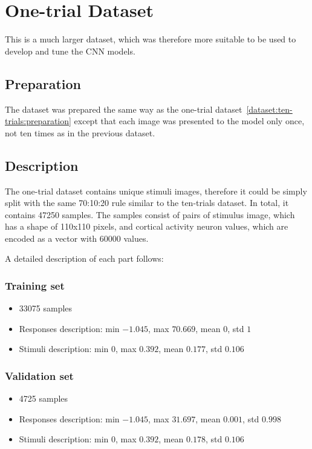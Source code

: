 \section{One-trial Dataset}
\label{dataset:one-trial}
This is a much larger dataset, which was therefore more suitable to be used to develop and tune the CNN models.


\subsection{Preparation}
\label{dataset:one-trial:preparation}
The dataset was prepared the same way as the one-trial dataset~\ref{dataset:ten-trials:preparation} except that each image was presented to the model only once, not ten times as in the previous dataset.


\subsection{Description}
\label{dataset:one-trial:description}

The one-trial dataset contains unique stimuli images, therefore it could be simply split with the same 70:10:20 rule similar to the ten-trials dataset. In total, it contains 47250 samples.
The samples consist of pairs of stimulus image, which has a shape of 110x110 pixels, and cortical activity neuron values, which are encoded as a vector with 60000 values.

A detailed description of each part follows:

\subsubsection{Training set}
\begin{itemize}
\item 33075 samples
\item Responses description: min $-1.045$, max $70.669$, mean $0$, std $1$
\item Stimuli description: min $0$, max $0.392$, mean $0.177$, std $0.106$
\end{itemize}

\subsubsection{Validation set}
\begin{itemize}
\item 4725 samples
\item Responses description: min $-1.045$, max $31.697$, mean $0.001$, std $0.998$
\item Stimuli description: min $0$, max $0.392$, mean $0.178$, std $0.106$
\end{itemize}

